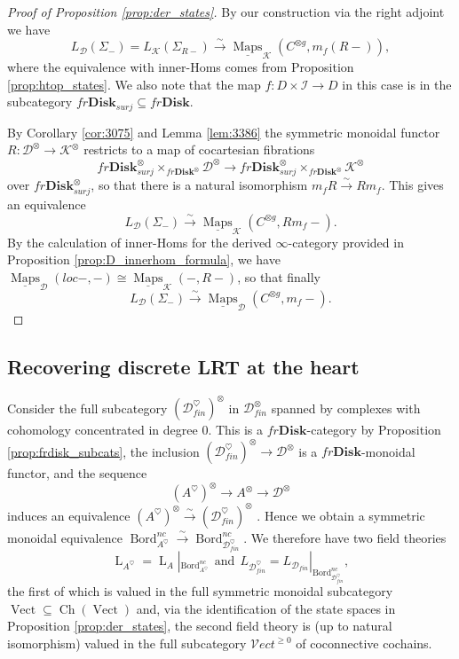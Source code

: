 \documentclass[reqno]{amsart}
\theoremstyle{definition}
\newcommand{\mcl}[1]{\mathcal{#1}}
\newcommand{\msc}[1]{\mathscr{#1}}
\newcommand{\opn}[1]{\operatorname{#1}}
\newcommand{\ot}{\otimes}
\newcommand{\Vect}{\msc{V}\!ect}
\newcommand{\Disk}{\mathbf{Disk}}
\DeclareMathOperator{\Maps}{Maps}
\DeclareMathOperator{\Bord}{Bord}
\renewcommand{\1}{\mathbf{1}}
\begin{document}
\begin{proof}[Proof of Proposition \ref{prop:der_states}]
By our construction via the right adjoint we have
\[
L_{\msc{D}}(\Sigma_-)=L_{\msc{K}}(\Sigma_{R-})\overset{\sim}\to \underline{\Maps}_{\msc{K}}\left(C^{\ot g},m_f(R-)\right),
\]
where the equivalence with inner-Homs comes from Proposition \ref{prop:htop_states}.  We also note that the map $f:D\times \mcl{I}\to D$ in this case is in the subcategory $fr\Disk_{surj}\subseteq fr\Disk$.
\par

By Corollary \ref{cor:3075} and Lemma \ref{lem:3386} the symmetric monoidal functor $R:\msc{D}^{\ot}\to \msc{K}^{\ot}$ restricts to a map of cocartesian fibrations
\[
fr\Disk^{\ot}_{surj}\times_{fr\Disk^{\ot}}\msc{D}^{\ot}\to fr\Disk^{\ot}_{surj}\times_{fr\Disk^{\ot}}\msc{K}^{\ot}
\]
over $fr\Disk^{\ot}_{surj}$, so that there is a natural isomorphism $m_fR\overset{\sim}\to Rm_f$.  This gives an equivalence
\[
L_{\msc{D}}(\Sigma_-)\overset{\sim}\to \underline{\Maps}_{\msc{K}}\left(C^{\ot g},Rm_f-\right).
\]
By the calculation of inner-Homs for the derived $\infty$-category provided in Proposition \ref{prop:D_innerhom_formula}, we have $\underline{\Maps}_{\msc{D}}(loc-,-)\cong \underline{\Maps}_{\msc{K}}(-,R-)$, so that finally
\[
L_{\msc{D}}(\Sigma_-)\overset{\sim}\to \underline{\Maps}_{\msc{D}}(C^{\ot g},m_f-).
\]
\end{proof}

\subsection{Recovering discrete LRT at the heart}

Consider the full subcategory $(\msc{D}^{\heartsuit}_{fin})^{\ot}$ in $\msc{D}_{fin}^{\ot}$ spanned by complexes with cohomology concentrated in degree $0$.  This is a $fr\Disk$-category by Proposition \ref{prop:frdisk_subcats}, the inclusion $(\msc{D}^{\heartsuit}_{fin})^{\ot}\to \msc{D}^{\ot}$ is a $fr\Disk$-monoidal functor, and the sequence
\[
(A^{\heartsuit})^{\ot}\to A^{\ot}\to \msc{D}^{\ot}
\]
induces an equivalence $(A^{\heartsuit})^{\ot}\overset{\sim}\to (\msc{D}_{fin}^{\heartsuit})^{\ot}$ \cite[\href{https://kerodon.net/tag/028B}{0288}]{kerodon}. Hence we obtain a symmetric monoidal equivalence $\Bord_{A^{\heartsuit}}^{nc}\overset{\sim}\to \Bord_{\msc{D}_{fin}^{\heartsuit}}^{nc}$. We therefore have two field theories
\[
\opn{L}_{A^{\heartsuit}}=\opn{L}_A|_{\Bord_{A^{\heartsuit}}^{nc}}\ \ \text{and}\ \ L_{\msc{D}_{fin}^{\heartsuit}}=L_{\msc{D}_{fin}}|_{\Bord_{\msc{D}_{fin}^{\heartsuit}}^{nc}},
\]
the first of which is valued in the full symmetric monoidal subcategory $\opn{Vect}\subseteq \opn{Ch}(\opn{Vect})$ and, via the identification of the state spaces in Proposition \ref{prop:der_states}, the second field theory is (up to natural isomorphism) valued in the full subcategory $\Vect^{\geq 0}$ of coconnective cochains.
\par
\end{document}
